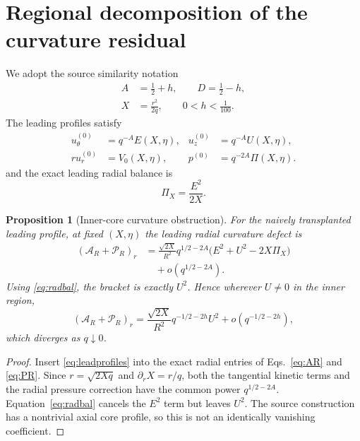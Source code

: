 \documentclass[aps,prd,reprint,superscriptaddress,nofootinbib,floatfix]{revtex4-2}
\newtheorem{proposition}[theorem]{Proposition}
\theoremstyle{definition}
\theoremstyle{remark}
\newcommand{\cA}{\mathcal{A}}
\newcommand{\cP}{\mathcal{P}}
\begin{document}
\section{Regional decomposition of the curvature residual}\label{sec:regional}

We adopt the source similarity notation
\begin{align}
	A & =\frac12+h,\qquad D=\frac12-h,\nonumber \\
	X & =\frac{r^2}{2q},\qquad 0<h<\frac1{100}.
	\label{eq:AD}
\end{align}
The leading profiles satisfy
\begin{align}
	u_\theta^{(0)} & =q^{-A}E(X,\eta),          &
	u_z^{(0)}      & =q^{-A}U(X,\eta),\nonumber   \\
	r u_r^{(0)}    & =V_0(X,\eta),              &
	p^{(0)}        & =q^{-2A}\Pi(X,\eta).
	\label{eq:leadprofiles}
\end{align}
and the exact leading radial balance is
\begin{equation}
	\Pi_X=\frac{E^2}{2X}.
	\label{eq:radbal}
\end{equation}

\begin{proposition}[Inner-core curvature obstruction]\label{prop:innerobs}
	For the naively transplanted leading profile, at fixed $(X,\eta)$ the leading radial curvature defect is
	\begin{align}
		(\cA_R+\cP_R)_r
		 & =\frac{\sqrt{2X}}{R^2}q^{1/2-2A}
		\bigl(E^2+U^2-2X\Pi_X\bigr)\nonumber \\
		 & \quad+o(q^{1/2-2A}).
		\label{eq:innerobs}
	\end{align}
	Using \eqref{eq:radbal}, the bracket is exactly $U^2$. Hence wherever $U\neq0$ in the inner region,
	\begin{equation}
		(\cA_R+\cP_R)_r
		=\frac{\sqrt{2X}}{R^2}q^{-1/2-2h}U^2+o(q^{-1/2-2h}),
		\label{eq:innerobsU}
	\end{equation}
	which diverges as $q\downarrow0$.
\end{proposition}

\begin{proof}
	Insert \eqref{eq:leadprofiles} into the exact radial entries of Eqs.~\eqref{eq:AR} and \eqref{eq:PR}. Since $r=\sqrt{2Xq}$ and $\partial_rX=r/q$, both the tangential kinetic terms and the radial pressure correction have the common power $q^{1/2-2A}$. Equation~\eqref{eq:radbal} cancels the $E^2$ term but leaves $U^2$. The source construction has a nontrivial axial core profile, so this is not an identically vanishing coefficient.
\end{proof}
\end{document}

